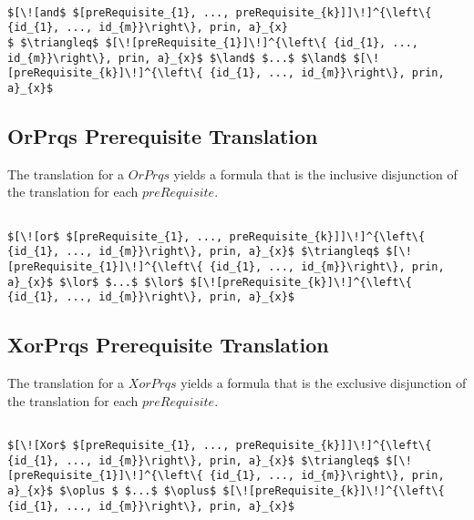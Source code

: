 \lstset{mathescape, language=AST}  
\begin{lstlisting}[frame=single, caption={Prerequisite Translation {$\colon$} Conjunction },label={lst:transpreRequisiteAndPrqs}]

$[\![and$ $[preRequisite_{1}, ..., preRequisite_{k}]]\!]^{\left\{ {id_{1}, ..., id_{m}}\right\}, prin, a}_{x}
$ $\triangleq$ $[\![preRequisite_{1}]\!]^{\left\{ {id_{1}, ..., id_{m}}\right\}, prin, a}_{x}$ $\land$ $...$ $\land$ $[\![preRequisite_{k}]\!]^{\left\{ {id_{1}, ..., id_{m}}\right\}, prin, a}_{x}$

\end{lstlisting}

\subsection{OrPrqs Prerequisite Translation}
The translation for a $OrPrqs$ yields a formula that is the inclusive disjunction of the translation for each $preRequisite$.

\lstset{mathescape, language=AST}  
\begin{lstlisting}[frame=single, caption={Prerequisite Translation {$\colon$} Inclusive Disjunction},label={lst:transpreRequisiteOrPrqs}]

$[\![or$ $[preRequisite_{1}, ..., preRequisite_{k}]]\!]^{\left\{ {id_{1}, ..., id_{m}}\right\}, prin, a}_{x}$ $\triangleq$ $[\![preRequisite_{1}]\!]^{\left\{ {id_{1}, ..., id_{m}}\right\}, prin, a}_{x}$ $\lor$ $...$ $\lor$ $[\![preRequisite_{k}]\!]^{\left\{ {id_{1}, ..., id_{m}}\right\}, prin, a}_{x}$

\end{lstlisting}

\subsection{XorPrqs Prerequisite Translation}
The translation for a $XorPrqs$ yields a formula that is the exclusive disjunction of the translation for each $preRequisite$.


\lstset{mathescape, language=AST}  
\begin{lstlisting}[frame=single, caption={Prerequisite Translation {$\colon$} Exclusive Disjunction},label={lst:transpreRequisiteXorPrqs}]

$[\![Xor$ $[preRequisite_{1}, ..., preRequisite_{k}]]\!]^{\left\{ {id_{1}, ..., id_{m}}\right\}, prin, a}_{x}$ $\triangleq$ $[\![preRequisite_{1}]\!]^{\left\{ {id_{1}, ..., id_{m}}\right\}, prin, a}_{x}$ $\oplus $ $...$ $\oplus$ $[\![preRequisite_{k}]\!]^{\left\{ {id_{1}, ..., id_{m}}\right\}, prin, a}_{x}$

\end{lstlisting}


